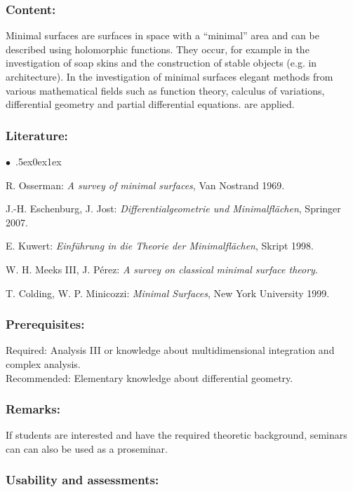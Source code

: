 \documentclass[a4paper,10pt]{article}
\renewenvironment{itemize}{\begin{list}{$\bullet$\ }{\itemsep.5ex\setlength{\topsep}{0.5\itemsep}\parsep0ex\labelsep1ex\settowidth{\labelwidth}{$\bullet$\ }\setlength{\leftmargin}{\labelwidth}\addtolength{\leftmargin}{3ex}\addtolength{\leftmargin}{\labelsep}}}{\end{list}}
\begin{document}
\subsubsection*{\large
    Content:
}
Minimal surfaces are surfaces in space with a “minimal” area and can be described using holomorphic functions. They occur, for example in the investigation of soap skins and the construction of stable objects (e.g. in architecture). In the investigation of minimal surfaces elegant methods from various mathematical fields such as function theory, calculus of variations, differential geometry and partial differential equations. are applied.
\subsubsection*{\large
    Literature:
}
\begin{itemize}
\item
R. Osserman: \emph{A survey of minimal surfaces}, Van Nostrand 1969. 
\item
J.-H. Eschenburg, J. Jost: \emph{Differentialgeometrie und Minimalflächen}, Springer 2007.
\item
E. Kuwert: \emph{Einführung in die Theorie der Minimalflächen}, Skript 1998.
\item
W. H. Meeks III, J. Pérez: \emph{A survey on classical minimal surface theory}.
\item
T. Colding, W. P. Minicozzi: \emph{Minimal Surfaces}, New York University 1999.
\end{itemize}
\subsubsection*{\large
    Prerequisites:
}
Required: Analysis III or knowledge about multidimensional integration and complex analysis. \\ Recommended: Elementary knowledge about differential geometry.
\subsubsection*{\large
    Remarks:
}
If students are interested and have the required theoretic background, seminars can can also be used as a proseminar. 

\cleardoublepage
\subsubsection*{\large
    Usability and assessments:
}
\end{document}

